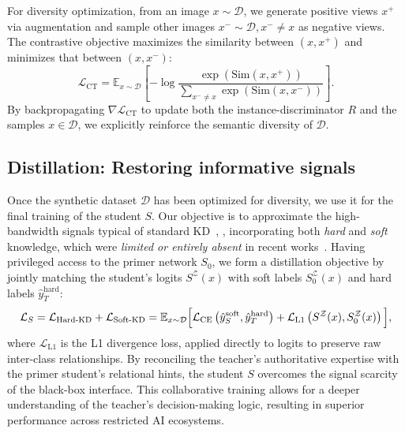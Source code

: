 \begin{foldable} %
  For diversity optimization, from an image $x \sim \mathcal{D}$, we generate positive views $x^{+}$ via augmentation and sample other images $x^{-} \sim \mathcal{D}, x^{-} \neq x$ as negative views.
  The contrastive objective maximizes the similarity between $(x, x^{+})$ and minimizes that between $(x, x^{-})$:
  \begin{equation} \label{eq:loss-contrastive}
    \mathcal{L}_\text{CT} = \mathbb{E}_{x \sim \mathcal{D}} \left[
      -\log \frac{ \exp\left( \text{Sim}(x, x^{+}) \right) }{ \sum_{x^{-} \ne x} \exp\left( \text{Sim}(x, x^{-}) \right) }
    \right].
  \end{equation}
  By backpropagating $\nabla\mathcal{L}_\text{CT}$ to update both the instance-discriminator $R$ and the samples $x \in \mathcal{D}$, we explicitly reinforce the semantic diversity of $\mathcal{D}$.
\end{foldable}

\subsection{Distillation: Restoring informative signals} \label{sec:43-research02-framework-distillation}
\begin{foldable}
  Once the synthetic dataset $\mathcal{D}$ has been optimized for diversity, we use it for the final training of the student $S$.
  Our objective is to approximate the high-bandwidth signals typical of standard \ac{KD}~\cite{hinton2015distilling}, \ie, incorporating both \textit{hard} and \textit{soft} knowledge, which were \textit{limited or entirely absent} in recent works~\cite{wang2021zero, zhang2022ideal, yuan2024data}.
  Having privileged access to the primer network $S_0$, we form a distillation objective by jointly matching the student's logits $S^\mathcal{Z}(x)$ with soft labels $S_{0}^\mathcal{Z}(x)$ and hard labels $\hat{y}_{T}^\text{hard}$:
  \begin{equation} \label{eq:loss-kd-total}
    \mathcal{L}_{S}
    = \mathcal{L}_\text{Hard-KD} + \mathcal{L}_\text{Soft-KD} \\
    = \mathbb{E}_{x \sim \mathcal{D}}\Big[
      \mathcal{L}_\text{CE}\left( \hat{y}_{S}^\text{soft}, \hat{y}_{T}^\text{hard} \right) +
      \mathcal{L}_\text{L1}\left( S^\mathcal{Z}(x), S_{0}^\mathcal{Z}(x) \right)
    \Big],
  \end{equation}
  where $\mathcal{L}_\text{L1}$ is the L1 divergence loss, applied directly to logits to preserve raw inter-class relationships.
  By reconciling the teacher's authoritative expertise with the primer student's relational hints, the student $S$ overcomes the signal scarcity of the black-box interface.
  This collaborative training allows for a deeper understanding of the teacher's decision-making logic, resulting in superior performance across restricted \ac{AI} ecosystems.
\end{foldable}
